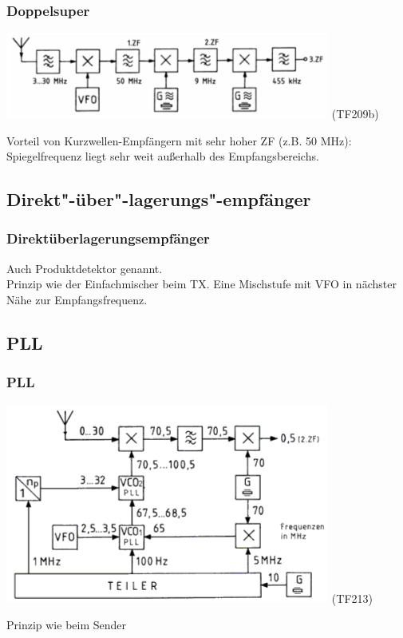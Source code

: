 \begin{frame}
    \frametitle{Doppelsuper}

    \begin{center}
        \includegraphics[width=0.8\textwidth,height=.5\textheight,keepaspectratio]{a13/TF209b.png}
	{\tiny (TF209b)}
    \end{center}

    Vorteil von Kurzwellen-Empfängern mit sehr hoher ZF (z.B. 50 MHz):
    Spiegelfrequenz liegt sehr weit außerhalb des Empfangsbereichs.

\end{frame}


\subsection{Direkt"-über"-lagerungs"-empfänger}

\begin{frame}
    \frametitle{Direktüberlagerungsempfänger}

    Auch Produktdetektor genannt. \\[2em]

    Prinzip wie der Einfachmischer beim TX. Eine Mischstufe mit VFO in nächster
    Nähe zur Empfangsfrequenz.

\end{frame}

\subsection{PLL}

\begin{frame}
    \frametitle{PLL}

    \begin{center}
        \includegraphics[width=0.8\textwidth,height=.7\textheight,keepaspectratio]{a13/TF213.png}
      {\tiny (TF213)}
    \end{center}

    Prinzip wie beim Sender
\end{frame}

